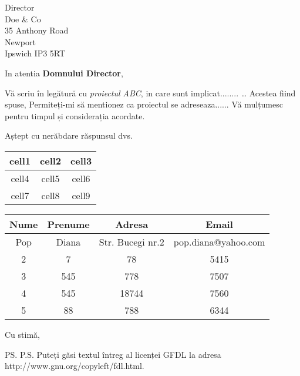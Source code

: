 \documentclass[a4paper,12pt]{letter}
\begin{document}
\begin{letter}{Director \\ Doe \& Co \\ 35 Anthony Road \\ Newport
\\ Ipswich IP3 5RT}
\opening{In atentia \textbf{Domnului Director},}
Vă scriu în legătură cu \textit{proiectul ABC}, in care sunt implicat........
\ldots
Acestea fiind spuse, Permiteți-mi să mentionez ca proiectul se adreseaza......
Vă mulțumesc pentru timpul și considerația acordate.

Aștept cu nerăbdare răspunsul dvs.
\begin{center}
\begin{tabular}{c c c}
cell1 & cell2 & cell3 \\
\hline
cell4 & cell5 & cell6 \\
\hline
cell7 & cell8 & cell9
\end{tabular}
\end{center}
\begin{center}
\begin{tabular}{||c c c c||}
\hline
Nume & Prenume & Adresa & Email \\ [0.5ex]
\hline\hline
Pop & Diana & Str. Bucegi nr.2 & pop.diana@yahoo.com\\
\hline
2 & 7 & 78 & 5415 \\
\hline
3 & 545 & 778 & 7507 \\
\hline
4 & 545 & 18744 & 7560 \\
\hline
5 & 88 & 788 & 6344 \\ [1ex]
\hline
\end{tabular}
\end{center}
\closing{Cu stimă,}
\ps{P.S. Puteți găsi textul întreg al licenței GFDL la adresa
http://www.gnu.org/copyleft/fdl.html.}
\end{letter}
\end{document}
